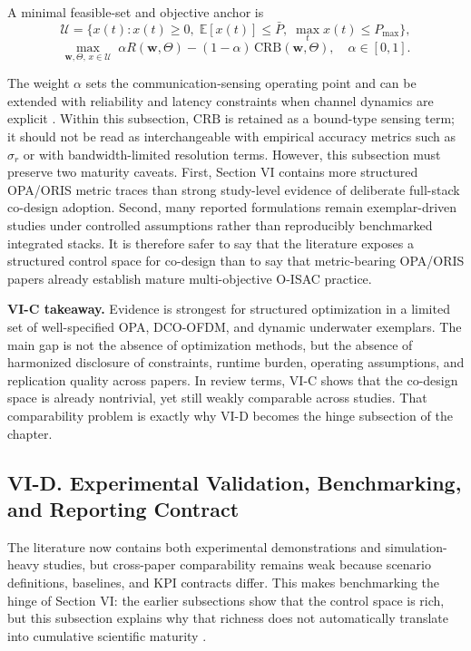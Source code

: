 A minimal feasible-set and objective anchor is
\[
\mathcal U=\{x(t):x(t)\ge 0,\;\mathbb{E}[x(t)]\le \bar P,\;\max_t x(t)\le P_{\max}\},
\]
\[
\max_{\mathbf{w},\Theta,\,x\in\mathcal U}\;\alpha R(\mathbf{w},\Theta)-(1-\alpha)\,\mathrm{CRB}(\mathbf{w},\Theta),\quad \alpha\in[0,1].
\]

The weight $\alpha$ sets the communication-sensing operating point and can be extended with reliability and latency constraints when channel dynamics are explicit \cite{O_ISAC_023,O_ISAC_061,O_ISAC_091,O_ISAC_127}. Within this subsection, $\mathrm{CRB}$ is retained as a bound-type sensing term; it should not be read as interchangeable with empirical accuracy metrics such as $\sigma_r$ or with bandwidth-limited resolution terms. However, this subsection must preserve two maturity caveats. First, Section VI contains more structured OPA/ORIS metric traces than strong study-level evidence of deliberate full-stack co-design adoption. Second, many reported formulations remain exemplar-driven studies under controlled assumptions rather than reproducibly benchmarked integrated stacks. It is therefore safer to say that the literature exposes a structured control space for co-design than to say that metric-bearing OPA/ORIS papers already establish mature multi-objective O-ISAC practice.

\textbf{VI-C takeaway.} Evidence is strongest for structured optimization in a limited set of well-specified OPA, DCO-OFDM, and dynamic underwater exemplars. The main gap is not the absence of optimization methods, but the absence of harmonized disclosure of constraints, runtime burden, operating assumptions, and replication quality across papers. In review terms, VI-C shows that the co-design space is already nontrivial, yet still weakly comparable across studies. That comparability problem is exactly why VI-D becomes the hinge subsection of the chapter.

\subsection{VI-D. Experimental Validation, Benchmarking, and Reporting Contract}

The literature now contains both experimental demonstrations and simulation-heavy studies, but cross-paper comparability remains weak because scenario definitions, baselines, and KPI contracts differ. This makes benchmarking the hinge of Section VI: the earlier subsections show that the control space is rich, but this subsection explains why that richness does not automatically translate into cumulative scientific maturity \cite{O_ISAC_023,O_ISAC_035,O_ISAC_054,O_ISAC_061,O_ISAC_091,O_ISAC_112,O_ISAC_127}.

